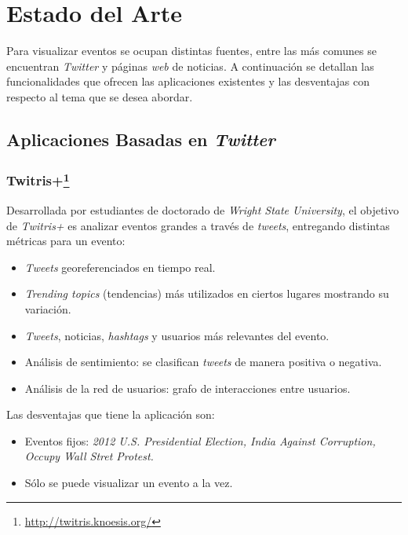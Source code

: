 \documentclass[10pt]{article}
\begin{document}
\section{Estado del Arte}

	Para visualizar eventos se ocupan distintas fuentes, entre las más comunes se encuentran \emph{Twitter} y páginas \emph{web} de noticias. A continuación se detallan las funcionalidades que ofrecen las aplicaciones existentes y las desventajas con respecto al tema que se desea abordar.

\subsection{Aplicaciones Basadas en \emph{Twitter}}

\subsubsection*{Twitris+\footnote{\url{http://twitris.knoesis.org/}}}

	Desarrollada por estudiantes de doctorado de \emph{Wright State University}, el objetivo de \emph{Twitris+}\cite{twitris} es analizar eventos grandes a través de \emph{tweets}, entregando distintas métricas para un evento: 

	\begin{itemize}
		\item \emph{Tweets} georeferenciados en tiempo real.
		\item \emph{Trending topics} (tendencias) más utilizados en ciertos lugares mostrando su variación.
		\item \emph{Tweets}, noticias, \emph{hashtags} y usuarios más relevantes del evento.
		\item Análisis de sentimiento: se clasifican \emph{tweets} de manera positiva o negativa.
		\item Análisis de la red de usuarios: grafo de interacciones entre usuarios.
	\end{itemize}

	Las desventajas que tiene la aplicación son:

	\begin{itemize}
		\item Eventos fijos: \emph{2012 U.S. Presidential Election, India Against Corruption, Occupy Wall Stret Protest.}
		\item Sólo se puede visualizar un evento a la vez.
	\end{itemize}
	
\end{document}
